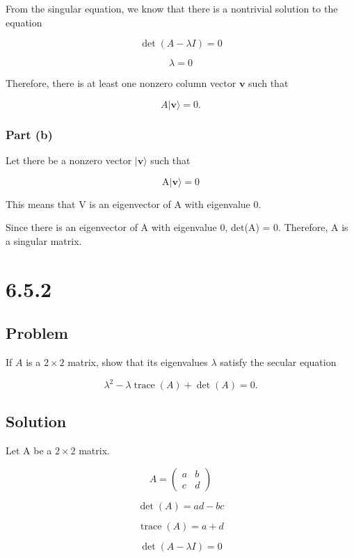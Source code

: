 \documentclass[12pt]{article}
\begin{document}
From the singular equation, we know that there is a nontrivial solution to the equation

\[
    \det (A - \lambda I ) = 0
\]

\[
    \lambda = 0
\]

Therefore, there is at least one nonzero column vector \(\mathbf{v}\) such that

\[
    A|\mathbf{v}\rangle=0 .
\]

\subsubsection{Part (b)}

Let there be a nonzero vector \(|\mathbf{v}\rangle \) such that

\[
    \mathrm{A}|\mathbf{v}\rangle=0
\]

This means that V is an eigenvector of A with eigenvalue 0.

Since there is an eigenvector of A with eigenvalue 0, det(A) = 0. Therefore, A is a singular matrix.

\newpage
\section{6.5.2}

\subsection{Problem}

If \(A\) is a \(2 \times 2\) matrix, show that its eigenvalues \(\lambda \) satisfy the secular equation

\[
    \lambda^2-\lambda \operatorname{trace}(A)+\operatorname{\det}(A)=0 .
\]

\subsection{Solution}

Let A be a \(2 \times 2\) matrix.

\[
    A = \begin{pmatrix}
        a & b \\
        c & d
    \end{pmatrix}
\]

\[
    \det(A) = ad - bc
\]

\[
    \operatorname{trace}(A) = a + d
\]

\[
    \det(A - \lambda I) = 0
\]
\end{document}
